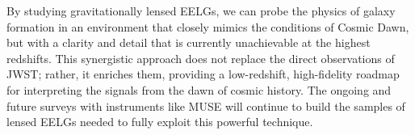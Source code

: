 \documentclass[fleqn,usenatbib]{mnras}
\begin{document}
By studying gravitationally lensed EELGs, we can probe the physics of galaxy formation in an environment that closely mimics the conditions of Cosmic Dawn, but with a clarity and detail that is currently unachievable at the highest redshifts. This synergistic approach does not replace the direct observations of JWST; rather, it enriches them, providing a low-redshift, high-fidelity roadmap for interpreting the signals from the dawn of cosmic history. The ongoing and future surveys with instruments like MUSE will continue to build the samples of lensed EELGs needed to fully exploit this powerful technique.




\bsp
\label{lastpage}
\end{document}
